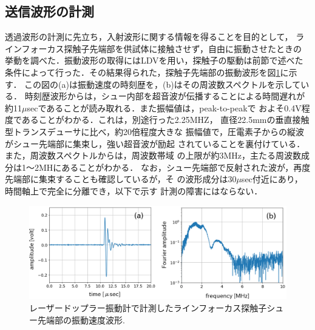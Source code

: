\subsection{送信波形の計測}
透過波形の計測に先立ち，入射波形に関する情報を得ることを目的として，
ラインフォーカス探触子先端部を供試体に接触させず，自由に振動させたときの
挙動を調べた．振動波形の取得にはLDVを用い，探触子の駆動は前節で述べた
条件によって行った．その結果得られた，探触子先端部の振動波形を図\ref{fig:fig5}に示す．
この図の(a)は振動速度の時刻歴を，(b)はその周波数スペクトルを示している．
時刻歴波形からは，シュー内部を超音波が伝播することによる時間遅れが
約11$\mu$secであることが読み取れる．また振幅値は，peak-to-peakで
およそ0.4V程度であることがわかる．これは，別途行った2.25MHZ，
直径22.5mmの垂直接触型トランスデューサに比べ，約20倍程度大きな
振幅値で，圧電素子からの縦波がシュー先端部に集束し，強い超音波が励起
されていることを裏付けている．また，周波数スペクトルからは，周波数帯域
の上限が約3MHz，主たる周波数成分は1〜2MHにあることがわかる．
なお，シュー先端部で反射された波が，再度先端部に集束することも確認しているが，そ
の波形成分は30$\mu$sec付近にあり，時間軸上で完全に分離でき，以下で示す
計測の障害にはならない．
\begin{figure}[h]
	\begin{center}
	\includegraphics[width=0.9\linewidth]{Figs/fig5.eps} 
	\end{center}
	\caption{
		レーザードップラー振動計で計測したラインフォーカス探触子シュー先端部の振動速度波形.
	} 
	\label{fig:fig5}
\end{figure}

